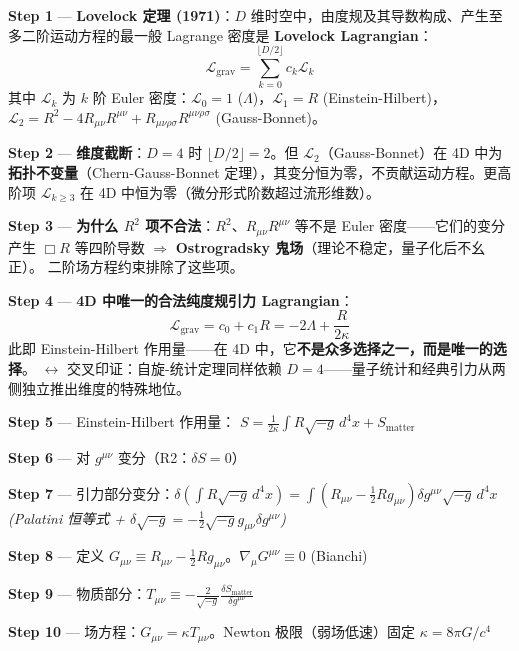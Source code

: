 \begin{derivationbox}

\noindent\textbf{Step 1} — \textbf{Lovelock 定理 (1971)}：$D$ 维时空中，由度规及其导数构成、产生至多二阶运动方程的最一般 Lagrange 密度是 \textbf{Lovelock Lagrangian}：
\begin{equation}
\mathcal{L}_{\text{grav}} = \sum_{k=0}^{\lfloor D/2\rfloor} c_k \mathcal{L}_k
\end{equation}
其中 $\mathcal{L}_k$ 为 $k$ 阶 Euler 密度：$\mathcal{L}_0=1$ ($\Lambda$)，$\mathcal{L}_1=R$ (Einstein-Hilbert)，$\mathcal{L}_2 = R^2-4R_{\mu\nu}R^{\mu\nu}+R_{\mu\nu\rho\sigma}R^{\mu\nu\rho\sigma}$ (Gauss-Bonnet)。

\noindent\textbf{Step 2} — \textbf{维度截断}：$D=4$ 时 $\lfloor D/2\rfloor=2$。但 $\mathcal{L}_2$（Gauss-Bonnet）在 4D 中为\textbf{拓扑不变量}（Chern-Gauss-Bonnet 定理），其变分恒为零，不贡献运动方程。更高阶项 $\mathcal{L}_{k\geq3}$ 在 4D 中恒为零（微分形式阶数超过流形维数）。

\noindent\textbf{Step 3} — \textbf{为什么 $R^2$ 项不合法}：$R^2$、$R_{\mu\nu}R^{\mu\nu}$ 等不是 Euler 密度——它们的变分产生 $\Box R$ 等四阶导数 $\Rightarrow$ \textbf{Ostrogradsky 鬼场}（理论不稳定，量子化后不幺正）。\fbox{[N]} 二阶场方程约束排除了这些项。

\noindent\textbf{Step 4} — \textbf{4D 中唯一的合法纯度规引力 Lagrangian}：
\begin{equation}
\mathcal{L}_{\text{grav}} = c_0 + c_1 R = -2\Lambda + \frac{R}{2\kappa}
\end{equation}
此即 Einstein-Hilbert 作用量——在 4D 中，它\textbf{不是众多选择之一，而是唯一的选择}。
$\leftrightarrow$ 交叉印证：自旋-统计定理同样依赖 $D=4$——量子统计和经典引力从两侧独立推出维度的特殊地位。

\noindent\textbf{Step 5} — Einstein-Hilbert 作用量：
$S = \frac{1}{2\kappa}\int R\sqrt{-g}\,d^4x + S_{\text{matter}}$

\noindent\textbf{Step 6} — 对 $g^{\mu\nu}$ 变分（R2：$\delta S = 0$）

\noindent\textbf{Step 7} — 引力部分变分：$\delta(\int R\sqrt{-g}\,d^4x) = \int (R_{\mu\nu} - \frac{1}{2}Rg_{\mu\nu})\delta g^{\mu\nu}\sqrt{-g}\,d^4x$
\hfill\textit{(Palatini 恒等式 + $\delta\sqrt{-g} = -\frac{1}{2}\sqrt{-g}g_{\mu\nu}\delta g^{\mu\nu}$)}

\noindent\textbf{Step 8} — 定义 $G_{\mu\nu} \equiv R_{\mu\nu} - \frac{1}{2}Rg_{\mu\nu}$。$\nabla_\mu G^{\mu\nu} \equiv 0$ (Bianchi)

\noindent\textbf{Step 9} — 物质部分：$T_{\mu\nu} \equiv -\frac{2}{\sqrt{-g}}\frac{\delta S_{\text{matter}}}{\delta g^{\mu\nu}}$

\noindent\textbf{Step 10} — 场方程：$G_{\mu\nu} = \kappa T_{\mu\nu}$。Newton 极限（弱场低速）固定 $\kappa = 8\pi G/c^4$
\end{derivationbox}

